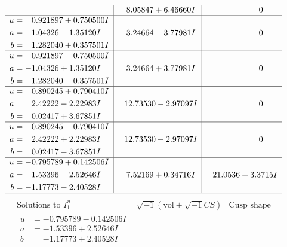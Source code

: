 \documentclass[1p]{elsarticle_modified}
\theoremstyle{definition}
\newcommand{\I}{\sqrt{-1}}
\begin{document}
$$\begin{array}{c|c|c}
 & \phantom{-}8.05847 + 6.46660 I & \phantom{-0.000000 } 0 \\ \hline\begin{aligned}
u &= \phantom{-}0.921897 + 0.750500 I \\
a &= -1.04326 - 1.35120 I \\
b &= \phantom{-}1.282040 + 0.357501 I\end{aligned}
 & \phantom{-}3.24664 - 3.77981 I & \phantom{-0.000000 } 0 \\ \hline\begin{aligned}
u &= \phantom{-}0.921897 - 0.750500 I \\
a &= -1.04326 + 1.35120 I \\
b &= \phantom{-}1.282040 - 0.357501 I\end{aligned}
 & \phantom{-}3.24664 + 3.77981 I & \phantom{-0.000000 } 0 \\ \hline\begin{aligned}
u &= \phantom{-}0.890245 + 0.790410 I \\
a &= \phantom{-}2.42222 - 2.22983 I \\
b &= \phantom{-}0.02417 + 3.67851 I\end{aligned}
 & \phantom{-}12.73530 - 2.97097 I & \phantom{-0.000000 } 0 \\ \hline\begin{aligned}
u &= \phantom{-}0.890245 - 0.790410 I \\
a &= \phantom{-}2.42222 + 2.22983 I \\
b &= \phantom{-}0.02417 - 3.67851 I\end{aligned}
 & \phantom{-}12.73530 + 2.97097 I & \phantom{-0.000000 } 0 \\ \hline\begin{aligned}
u &= -0.795789 + 0.142506 I \\
a &= -1.53396 - 2.52646 I \\
b &= -1.17773 - 2.40528 I\end{aligned}
 & \phantom{-}7.52169 + 0.34716 I & \phantom{-}21.0536 + 3.3715 I\\
 \hline 
 \end{array}$$\newpage$$\begin{array}{c|c|c}  
\text{Solutions to }I^u_{1}& \I (\text{vol} + \sqrt{-1}CS) & \text{Cusp shape}\\
 \hline 
\begin{aligned}
u &= -0.795789 - 0.142506 I \\
a &= -1.53396 + 2.52646 I \\
b &= -1.17773 + 2.40528 I\end{aligned}

\end{array}$$
\end{document}
